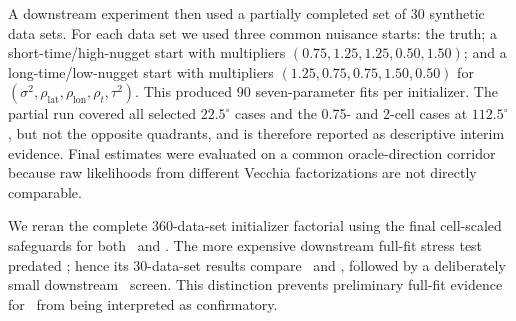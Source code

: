 A downstream experiment then used a partially completed set of 30 synthetic
data sets.  For each data set we used three common nuisance starts: the truth;
a short-time/high-nugget start with multipliers
$(0.75,1.25,1.25,0.50,1.50)$; and a long-time/low-nugget start with multipliers
$(1.25,0.75,0.75,1.50,0.50)$ for
$(\sigma^2,\rho_{\mathrm{lat}},\rho_{\mathrm{lon}},\rho_t,\tau^2)$.
This produced 90 seven-parameter fits per initializer.  The partial run covered
all selected $22.5^\circ$ cases and the 0.75- and 2-cell cases at
$112.5^\circ$, but not the opposite quadrants, and is therefore reported as
descriptive interim evidence.  Final estimates were evaluated on a common
oracle-direction corridor because raw likelihoods from different Vecchia
factorizations are not directly comparable.

We reran the complete 360-data-set initializer factorial using the final
cell-scaled safeguards for both \Qthree\ and \Qfive.  The more expensive
downstream full-fit stress test predated \Qfive; hence its 30-data-set results
compare \Mthree\ and \Qthree, followed by a deliberately small downstream
\Qfive\ screen.  This distinction prevents preliminary full-fit evidence for
\Qfive\ from being interpreted as confirmatory.

